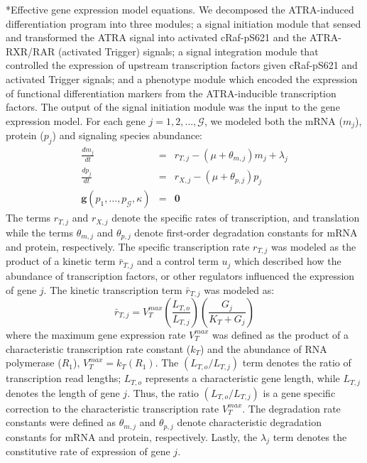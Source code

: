 \documentclass[12pt]{article}
\makeatletter
\renewcommand\subsubsection{\@startsection
	{subsubsection}{2}{0mm}
	{-0.05in}
	{-0.5\baselineskip}
	{\normalfont\normalsize\itshape}}
\makeatother
\begin{document}
\subsubsection*{Effective gene expression model equations.}
We decomposed the ATRA-induced differentiation program into three modules;
a signal initiation module that sensed and transformed the ATRA signal into activated cRaf-pS621 and the ATRA-RXR/RAR (activated Trigger) signals;
a signal integration module that controlled the expression of upstream transcription factors given cRaf-pS621 and activated Trigger signals; and
a phenotype module which encoded the expression of functional differentiation markers from the ATRA-inducible transcription factors.
The output of the signal initiation module was the input to the gene expression model.
For each gene $j=1,2,\dots,\mathcal{G}$, we modeled both the mRNA ($m_{j}$), protein ($p_{j}$) and signaling species abundance:
\begin{eqnarray}
	\frac{dm_{j}}{dt} &=& r_{T,j} - \left(\mu+\theta_{m,j}\right)m_{j}+\lambda_{j}\\
	\frac{dp_{j}}{dt} &=& r_{X,j} - \left(\mu+\theta_{p,j}\right)p_{j}\\\label{eqn-signaling-balances}
	\mathbf{g}\left(p_{1},\hdots,p_{\mathcal{G}},\kappa\right) &=& \mathbf{0}
\end{eqnarray}
The terms $r_{T,j}$ and $r_{X,j}$ denote the specific rates of transcription, and translation while
the terms $\theta_{m,j}$ and $\theta_{p,j}$ denote first-order degradation constants for mRNA and protein, respectively.
The specific transcription rate $r_{T,j}$ was modeled as the product of a kinetic term $\bar{r}_{T,j}$ and a control term $u_{j}$ which described how the
abundance of transcription factors, or other regulators influenced the expression of gene $j$.
The kinetic transcription term $\bar{r}_{T,j}$ was modeled as:
\begin{equation}
	\bar{r}_{T,j} = V^{max}_{T}\left(\frac{L_{T,o}}{L_{T,j}}\right)\left(\frac{G_{j}}{K_{T}+G_{j}}\right)
\end{equation}where the maximum gene expression rate $V^{max}_{T}$ was defined as the product of a characteristic transcription rate constant ($k_{T}$)
and the abundance of RNA polymerase ($R_{1}$), $V^{max}_{T} = k_{T}\left(R_{1}\right)$.
The $\left(L_{T,o}/L_{T,j}\right)$ term denotes the ratio of transcription read lengths; $L_{T,o}$ represents a characteristic gene length, while $L_{T,j}$ denotes the length of gene $j$.
Thus, the ratio $\left(L_{T,o}/L_{T,j}\right)$ is a gene specific correction to the characteristic transcription rate $V^{max}_{T}$.
The degradation rate constants were defined as $\theta_{m,j}$ and $\theta_{p,j}$ denote characteristic degradation constants for mRNA and protein, respectively.
Lastly, the $\lambda_{j}$ term denotes the constitutive rate of expression of gene $j$.
\end{document}
